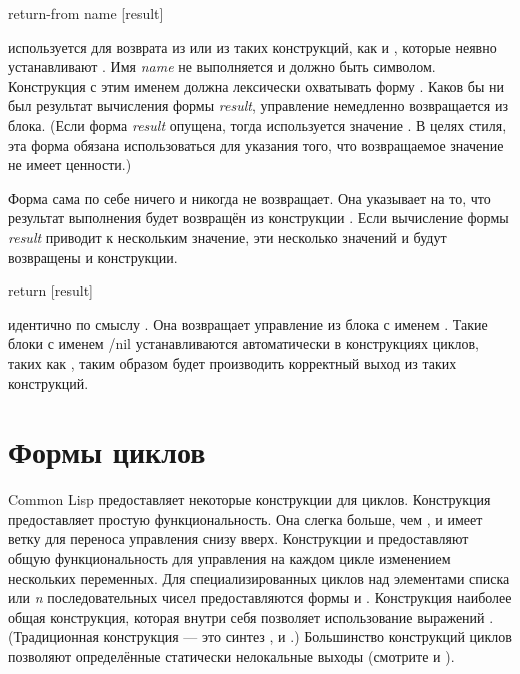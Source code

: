 \begin{defspec}
return-from name [result]

 используется для возврата из  или из таких
конструкций, как  и , которые неявно устанавливают
.
Имя \emph{name} не выполняется и должно быть символом.
Конструкция  с этим именем должна лексически охватывать форму
.
Каков бы ни был результат вычисления формы \emph{result}, управление немедленно
возвращается из блока.
(Если форма \emph{result} опущена, тогда используется значение {\nil}. В целях
стиля, эта форма обязана использоваться для указания того, что возвращаемое
значение не имеет ценности.)

Форма  сама по себе ничего и никогда не возвращает.
Она указывает на то, что результат выполнения будет возвращён из конструкции
.
Если вычисление формы \emph{result} приводит к нескольким значение, эти
несколько значений и будут возвращены и конструкции.
\end{defspec}

\begin{defmac}
return [result]

 идентично по смыслу 
. Она возвращает управление из блока с
именем {\nil}.
Такие блоки с именем {/nil} устанавливаются автоматически в конструкциях циклов,
таких как , таким образом  будет производить корректный
выход из таких конструкций.
\end{defmac}

\section{Формы циклов}

Common Lisp предоставляет некоторые конструкции для циклов. Конструкция
 предоставляет простую функциональность. Она слегка больше, чем
, и имеет ветку для переноса управления снизу вверх.
Конструкции  и  предоставляют общую функциональность для
управления на каждом цикле изменением нескольких переменных.
Для специализированных циклов над элементами списка или \emph{n}
последовательных чисел предоставляются формы  и .
Конструкция  наиболее общая конструкция, которая внутри себя
позволяет использование выражений . (Традиционная конструкция 
--- это синтез ,  и .)
Большинство конструкций циклов позволяют определённые статически нелокальные
выходы (смотрите  и ).

